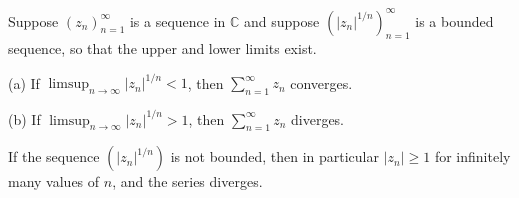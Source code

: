 Suppose $(z_n)_{n=1}^{\infty}$ is a sequence in $\mathbb{C}$ and suppose $(|z_n|^{1/n})_{n=1}^{\infty}$ is a bounded sequence, so that the upper and lower limits exist.

(a) If $\displaystyle \limsup_{n \to \infty} |z_n|^{1/n} < 1$, then $\sum_{n=1}^{\infty} z_n$ converges.

(b) If $\displaystyle \limsup_{n \to \infty} |z_n|^{1/n} > 1$, then $\sum_{n=1}^{\infty} z_n$ diverges.

If the sequence $(|z_n|^{1/n})$ is not bounded, then in particular $|z_n| \geq 1$ for infinitely many values of $n$, and the series diverges.
